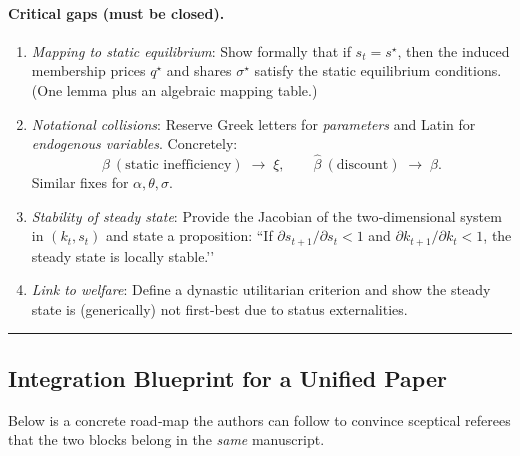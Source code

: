\documentclass[12pt,letterpaper]{article}
\begin{document}
\paragraph{Critical gaps (must be closed).}
\begin{enumerate}%
	\item \emph{Mapping to static equilibrium}: Show formally that if $s_t=s^\star$, then the induced membership prices $q^\star$ and shares $\sigma^\star$ satisfy the static equilibrium conditions.  (One lemma plus an algebraic mapping table.)
	\item \emph{Notational collisions}: Reserve Greek letters for \emph{parameters} and Latin for \emph{endogenous variables}.  Concretely:
	\[
	\beta\ (\text{static inefficiency}) \;\longrightarrow\; \xi,\qquad
	\hat{\beta}\ (\text{discount}) \;\longrightarrow\; \beta.
	\]
	Similar fixes for $\alpha,\theta,\sigma$.
	\item \emph{Stability of steady state}: Provide the Jacobian of the two‐dimensional system in $(k_t,s_t)$ and state a proposition: “If $\partial s_{t+1}/\partial s_t<1$ and $\partial k_{t+1}/\partial k_t<1$, the steady state is locally stable.’’
	\item \emph{Link to welfare}: Define a dynastic utilitarian criterion and show the steady state is (generically) not first‐best due to status externalities.
\end{enumerate}

\bigskip
\hrule
\bigskip

\subsection{Integration Blueprint for a Unified Paper}

Below is a concrete road‐map the authors can follow to convince sceptical referees that the two blocks belong in the \emph{same} manuscript.
\end{document}
